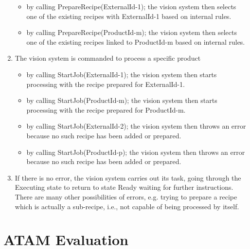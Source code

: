 \begin{enumerate}
\begin{itemize}
    \item by calling PrepareRecipe(ExternalId-1); the vision system then selects one of the existing recipes with 
    ExternalId-1 based on internal rules.
    \item by calling PrepareRecipe(ProductId-m); the vision system then selects one of the existing recipes 
    linked to ProductId-m based on internal rules. 
    \end{itemize}
    \item The vision system is commanded to process a specific product
    \begin{itemize}
        \item by calling StartJob(ExternalId-1); the vision system then starts processing with the recipe prepared for ExternalId-1. 
        \item by calling StartJob(ProductId-m); the vision system then starts processing with the recipe prepared for ProductId-m. 
        \item by calling StartJob(ExternalId-2); the vision system then throws an error because no such recipe has 
        been added or prepared.
        \item by calling StartJob(ProductId-p); the vision system then throws an error because no such recipe has 
        been added or prepared. 
    \end{itemize}
    \item If there is no error, the vision system carries out its task, going through the Executing state to return to state Ready waiting for further instructions. There are many other possibilities of errors, e.g. trying to prepare a recipe which is actually a sub-recipe, i.e., not capable of being processed by itself. 
\end{enumerate}

\chapter{ATAM Evaluation}
